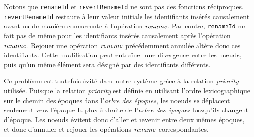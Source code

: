 Notons que \texttt{renameId} et \texttt{revertRenameId} ne sont pas des fonctions réciproques.
\texttt{revertRenameId} restaure à leur valeur initiale les identifiants insérés causalement avant ou de manière concurrente à l'opération $\mathit{rename}$.
Par contre, \texttt{renameId} ne fait pas de même pour les identifiants insérés causalement après l'opération $\mathit{rename}$.
Rejouer une opération $\mathit{rename}$ précédemment annulée altère donc ces identifiants.
Cette modification peut entraîner une divergence entre les noeuds, puis qu'un même élément sera désigné par des identifiants différents.

Ce problème est toutefois évité dans notre système grâce à la relation \emph{priority} utilisée.
Puisque la relation \emph{priority} est définie en utilisant l'ordre lexicographique sur le chemin des époques dans l'\emph{arbre des époques}, les noeuds se déplacent seulement vers l'époque la plus à droite de l'\emph{arbre des époques} lorsqu'ils changent d'époque.
Les noeuds évitent donc d'aller et revenir entre deux mêmes époques, et donc d'annuler et rejouer les opérations $\mathit{rename}$ correspondantes.
